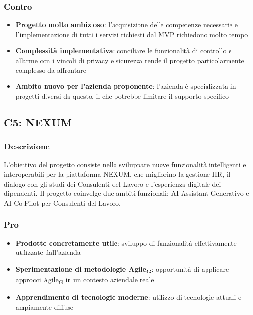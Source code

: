 \documentclass[11pt,a4paper]{article}
\newcommand{\gls}[1]{#1\textsubscript{G}}
\begin{document}
\subsubsection{Contro}
\begin{itemize}
    \item \textbf{Progetto molto ambizioso}: l'acquisizione delle competenze necessarie e l'implementazione di tutti i servizi richiesti dal MVP richiedono molto tempo
    \item \textbf{Complessità implementativa}: conciliare le funzionalità di controllo e allarme con i vincoli di privacy e sicurezza rende il progetto particolarmente complesso da affrontare
    \item \textbf{Ambito nuovo per l'azienda proponente}: l'azienda è specializzata in progetti diversi da questo, il che potrebbe limitare il supporto specifico
\end{itemize}

\vspace{0.5cm}
\subsection{C5: NEXUM}

\subsubsection{Descrizione}
L'obiettivo del progetto consiste nello sviluppare nuove funzionalità intelligenti e interoperabili per la piattaforma NEXUM, che migliorino la gestione HR, il dialogo con gli studi dei Consulenti del Lavoro e l'esperienza digitale dei dipendenti. Il progetto coinvolge due ambiti funzionali: AI Assistant Generativo e AI Co-Pilot per Consulenti del Lavoro.

\subsubsection{Pro}
\begin{itemize}
    \item \textbf{Prodotto concretamente utile}: sviluppo di funzionalità effettivamente utilizzate dall'azienda
    \item \textbf{Sperimentazione di metodologie \gls{Agile}}: opportunità di applicare approcci \gls{Agile} in un contesto aziendale reale
    \item \textbf{Apprendimento di tecnologie moderne}: utilizzo di tecnologie attuali e ampiamente diffuse
\end{itemize}
\end{document}
